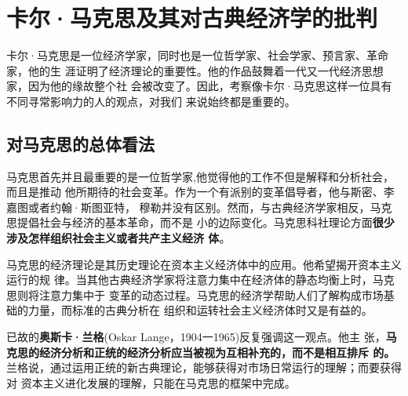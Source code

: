 \chapter{卡尔·马克思及其对古典经济学的批判}

卡尔·马克思是一位经济学家，同时也是一位哲学家、社会学家、预言家、革命家，他的生
涯证明了经济理论的重要性。他的作品鼓舞着一代又一代经济思想家，因为他的缘故整个社
会被改变了。因此，考察像卡尔·马克思这样一位具有不同寻常影响力的人的观点，对我们
来说始终都是重要的。

\section{对马克思的总体看法}

马克思首先并且最重要的是一位哲学家,他觉得他的工作不但是解释和分析社会，而且是推动
他所期待的社会变革。作为一个有派别的变革倡导者，他与斯密、李嘉图或者约翰·斯图亚特，
穆勒并没有区别。然而，与古典经济学家相反，马克思提倡社会与经济的基本革命，而不是
小的边际变化。马克思科社理论方面\textbf{很少涉及怎样组织社会主义或者共产主义经济
  体}。

马克思的经济理论是其历史理论在资本主义经济体中的应用。他希望揭开资本主义运行的规
律。当其他古典经济学家将注意力集中在经济体的静态均衡上时，马克思则将注意力集中于
变革的动态过程。马克思的经济学帮助人们了解构成市场基础的力量，而标准的古典分析在
组织和运转社会主义经济体时又是有益的。

已故的\textbf{奥斯卡·兰格}(Oskar Lange，1904一1965)反复强调这一观点。他主
张，\textbf{马克思的经济分析和正统的经济分析应当被视为互相补充的，而不是相互排斥
  的。}兰格说，通过运用正统的新古典理论，能够获得对市场日常运行的理解；而要获得对
资本主义进化发展的理解，只能在马克思的框架中完成。

